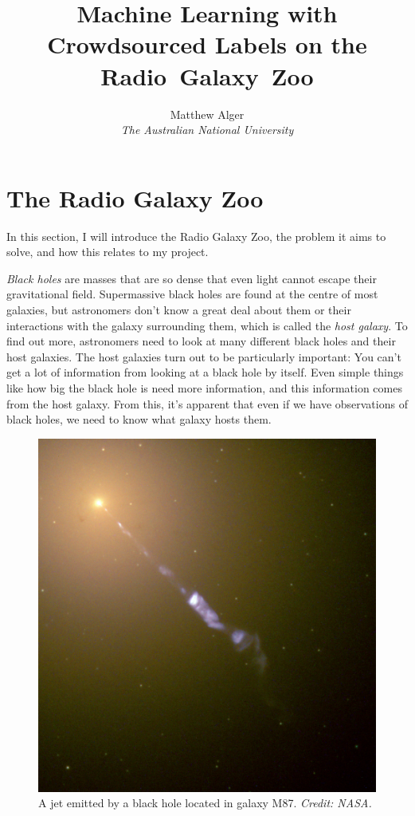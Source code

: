 \documentclass[a4paper]{article}
\begin{document}
    \title{Machine Learning with Crowdsourced Labels on the Radio~Galaxy~Zoo}
    \author{Matthew Alger \\ \emph{The Australian National University}}
    \maketitle

    \section{The Radio Galaxy Zoo}

        In this section, I will introduce the Radio Galaxy Zoo, the problem it aims to solve, and how this relates to my project.

        \emph{Black holes} are masses that are so dense that even light cannot escape their gravitational field. Supermassive black holes are found at the centre of most galaxies, but astronomers don't know a great deal about them or their interactions with the galaxy surrounding them, which is called the \emph{host galaxy}. To find out more, astronomers need to look at many different black holes and their host galaxies. The host galaxies turn out to be particularly important: You can't get a lot of information from looking at a black hole by itself. Even simple things like how big the black hole is need more information, and this information comes from the host galaxy. From this, it's apparent that even if we have observations of black holes, we need to know what galaxy hosts them.

        \begin{figure}[!h]
            \center
            \includegraphics[width=.5\textwidth]{images/M87_jet.jpg}
            \caption{A jet emitted by a black hole located in galaxy M87. \emph{Credit: NASA.}}
            \label{fig-jet}
        \end{figure}
\end{document}
